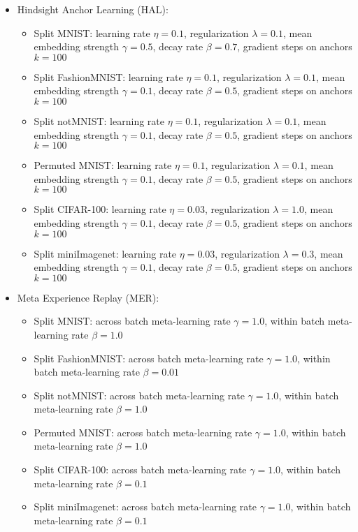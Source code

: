 \begin{itemize}
    \item Hindsight Anchor Learning (HAL):
    \begin{itemize}
        \item Split MNIST: learning rate $\eta = 0.1$, regularization $\lambda=0.1$, mean embedding strength $\gamma = 0.5$, decay rate $\beta=0.7$, gradient steps on anchors $k=100$
        \item Split FashionMNIST: learning rate $\eta = 0.1$, regularization $\lambda=0.1$, mean embedding strength $\gamma = 0.1$, decay rate $\beta=0.5$, gradient steps on anchors $k=100$
        \item Split notMNIST: learning rate $\eta = 0.1$, regularization $\lambda=0.1$, mean embedding strength $\gamma = 0.1$, decay rate $\beta=0.5$, gradient steps on anchors $k=100$
        \item Permuted MNIST: learning rate $\eta = 0.1$, regularization $\lambda=0.1$, mean embedding strength $\gamma = 0.1$, decay rate $\beta=0.5$, gradient steps on anchors $k=100$
        \item Split CIFAR-100: learning rate $\eta = 0.03$, regularization $\lambda=1.0$, mean embedding strength $\gamma = 0.1$, decay rate $\beta=0.5$, gradient steps on anchors $k=100$
        \item Split miniImagenet: learning rate $\eta = 0.03$, regularization $\lambda=0.3$, mean embedding strength $\gamma = 0.1$, decay rate $\beta=0.5$, gradient steps on anchors $k=100$
    \end{itemize}
    \item Meta Experience Replay (MER):
    \begin{itemize}
        \item Split MNIST: across batch meta-learning rate $\gamma = 1.0$, within batch meta-learning rate $\beta=1.0$ 
        \item Split FashionMNIST: across batch meta-learning rate $\gamma = 1.0$, within batch meta-learning rate $\beta=0.01$ 
        \item Split notMNIST: across batch meta-learning rate $\gamma = 1.0$, within batch meta-learning rate $\beta=1.0$ 
        \item Permuted MNIST: across batch meta-learning rate $\gamma = 1.0$, within batch meta-learning rate $\beta=1.0$ 
        \item Split CIFAR-100: across batch meta-learning rate $\gamma = 1.0$, within batch meta-learning rate $\beta=0.1$ 
        \item Split miniImagenet: across batch meta-learning rate $\gamma = 1.0$, within batch meta-learning rate $\beta=0.1$ 

\end{itemize}
\end{itemize}
